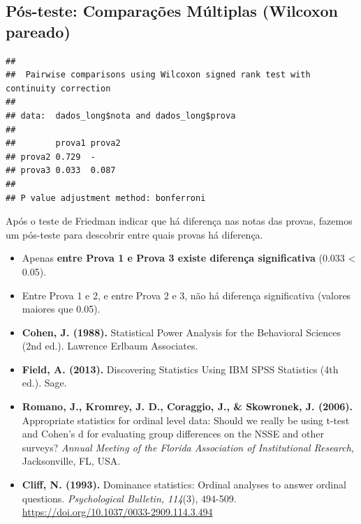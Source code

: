 \documentclass[
]{book}
\newenvironment{Shaded}{\begin{snugshade}}{\end{snugshade}}
\newcommand{\AttributeTok}[1]{\textcolor[rgb]{0.13,0.29,0.53}{#1}}
\newcommand{\ConstantTok}[1]{\textcolor[rgb]{0.56,0.35,0.01}{#1}}
\newcommand{\FunctionTok}[1]{\textcolor[rgb]{0.13,0.29,0.53}{\textbf{#1}}}
\newcommand{\NormalTok}[1]{#1}
\newcommand{\SpecialCharTok}[1]{\textcolor[rgb]{0.81,0.36,0.00}{\textbf{#1}}}
\newcommand{\StringTok}[1]{\textcolor[rgb]{0.31,0.60,0.02}{#1}}
\providecommand{\tightlist}{%
  \setlength{\itemsep}{0pt}\setlength{\parskip}{0pt}}
\begin{document}
\subsection{Pós-teste: Comparações Múltiplas (Wilcoxon pareado)}\label{puxf3s-teste-comparauxe7uxf5es-muxfaltiplas-wilcoxon-pareado}

\begin{Shaded}
\end{Shaded}

\begin{verbatim}
## 
##  Pairwise comparisons using Wilcoxon signed rank test with continuity correction 
## 
## data:  dados_long$nota and dados_long$prova 
## 
##        prova1 prova2
## prova2 0.729  -     
## prova3 0.033  0.087 
## 
## P value adjustment method: bonferroni
\end{verbatim}

Após o teste de Friedman indicar que há diferença nas notas das provas, fazemos um pós-teste para descobrir entre quais provas há diferença.

\begin{itemize}
\tightlist
\item
  Apenas \textbf{entre Prova 1 e Prova 3 existe diferença significativa} (0.033 \textless{} 0.05).
\item
  Entre Prova 1 e 2, e entre Prova 2 e 3, não há diferença significativa (valores maiores que 0.05).
\end{itemize}

\begin{itemize}
\item
  \textbf{Cohen, J. (1988).} Statistical Power Analysis for the Behavioral Sciences (2nd ed.). Lawrence Erlbaum Associates.
\item
  \textbf{Field, A. (2013).} Discovering Statistics Using IBM SPSS Statistics (4th ed.). Sage.
\item
  \textbf{Romano, J., Kromrey, J. D., Coraggio, J., \& Skowronek, J. (2006).} Appropriate statistics for ordinal level data: Should we really be using t-test and Cohen's d for evaluating group differences on the NSSE and other surveys? \emph{Annual Meeting of the Florida Association of Institutional Research}, Jacksonville, FL, USA.
\item
  \textbf{Cliff, N. (1993).} Dominance statistics: Ordinal analyses to answer ordinal questions. \emph{Psychological Bulletin, 114}(3), 494-509. \url{https://doi.org/10.1037/0033-2909.114.3.494}
\end{itemize}

  
\end{document}
